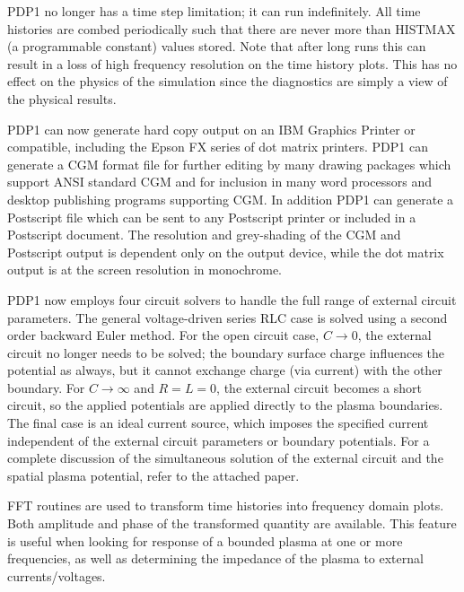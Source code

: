 \begin{section}
\begin{subsection}
\begin{subsubsection}
\noindent
      PDP1 no longer has a time step limitation; it can run indefinitely.  All
      time histories are combed periodically such that there are never more
      than HISTMAX (a programmable constant) values stored.  Note that after
      long runs this can result in a loss of high frequency resolution on the
      time history plots.  This has no effect on the physics of the simulation
      since the diagnostics are simply a view of the physical results.
\vspace{.2in}

\noindent
      PDP1 can now generate hard copy output on an IBM Graphics Printer or
      compatible, including the Epson FX series of dot matrix printers.  PDP1
      can generate a CGM format file for further editing by many drawing
      packages which support ANSI standard CGM and for inclusion in many word
      processors and desktop publishing programs supporting CGM.  In addition
      PDP1 can generate a Postscript file which can be sent to any Postscript
      printer or included in a Postscript document.  The resolution and
      grey-shading of the CGM and Postscript output is dependent only on the
      output device, while the dot matrix output is at the screen resolution in
      monochrome.
\vspace{.2in}

\noindent
      PDP1 now employs four circuit solvers to handle the full range of
      external circuit parameters.  The general voltage-driven series RLC case
      is solved using a second order backward Euler method.  For the open
      circuit case, $C \rightarrow 0$, the external circuit no longer needs to be
      solved; the boundary surface charge influences the potential as always,
      but it cannot exchange charge (via current) with the other boundary.  For
      $C \rightarrow \infty$ and $R = L = 0$, the external circuit becomes a
      short circuit, so the applied potentials are applied directly to the
      plasma boundaries.  The final case is an ideal current source, which
      imposes the specified current independent of the external circuit
      parameters or boundary potentials.  For a complete discussion of the
      simultaneous solution of the external circuit and the spatial plasma
      potential, refer to the attached paper\cite{kn:alves}.
\vspace{.2in}

\noindent
      FFT routines are used to transform time histories into frequency domain
      plots.  Both amplitude and phase of the transformed quantity are
      available.  This feature is useful when looking for response of a bounded
      plasma at one or more frequencies, as well as determining the impedance
      of the plasma to external currents/voltages.
\end{subsubsection}


\end{subsection}
\end{section}
